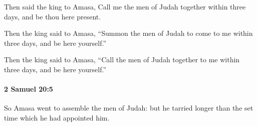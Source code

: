 			\begin{versebox}
					\item[BHS] 
					\item[ASV] Then said the king to Amasa, Call me the men of Judah together within three days, and be thou here present.
					\item[NIV] Then the king said to Amasa, “Summon the men of Judah to come to me within three days, and be here yourself.”
					\item[NRSV] Then the king said to Amasa, “Call the men of Judah together to me within three days, and be here yourself.”
			\end{versebox}

		\paragraph{2 Samuel 20:5} %
			\label{2SAMUEL-20-5}

			So Amasa went to assemble the men of Judah: but he tarried longer than the set time which he had appointed him.

